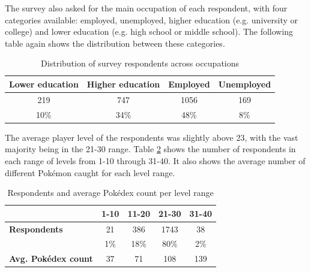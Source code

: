 The survey also asked for the main occupation of each respondent, with four categories available: employed, unemployed, higher education (e.g. university or college) and lower education (e.g. high school or middle school). The following table again shows the distribution between these categories.

\begin{table}[h]
	\centering
	\caption{Distribution of survey respondents across occupations}
	\label{tbl:survey-occupation-distribution}
	\begin{tabular}{|c|c|c|c|}
		\hline
		\textbf{Lower education} & \textbf{Higher education} & \textbf{Employed} & \textbf{Unemployed}\\
		\hline\hline
		219 & 747 & 1056 & 169\\
		10\% & 34\% & 48\% & 8\%\\
		\hline
	\end{tabular}
\end{table}

The average player level of the respondents was slightly above 23, with the vast majority being in the 21-30 range. Table \ref{tbl:survey-level-distribution} shows the number of respondents in each range of levels from 1-10 through 31-40. It also shows the average number of different Pokémon caught for each level range.

\begin{table}[h]
	\centering
	\caption{Respondents and average Pokédex count per level range}
	\label{tbl:survey-level-distribution}
	\begin{tabular}{|l||c|c|c|c|}
		\hline
		& \textbf{1-10} & \textbf{11-20} & \textbf{21-30} & \textbf{31-40}\\
		\hline\hline
		\textbf{Respondents}	& 21	& 386	& 1743	& 38\\
								& 1\%	& 18\%	& 80\%	& 2\%\\\hline
		\textbf{Avg. Pokédex count} & 37 & 71 & 108 & 139\\\hline
	\end{tabular}
\end{table}
